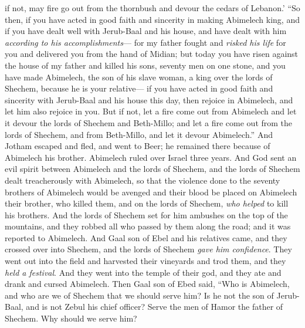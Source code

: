 \begin{biblechapter}
if not, may fire go out from the thornbush 
and devour the cedars of Lebanon.’
\verse “So then, if you have acted in good faith and sincerity in making Abimelech king, and if you have dealt well with Jerub-Baal and his house, and have dealt with him \textit{according to his accomplishments}—
\verse for my father fought and \textit{risked his life} for you and delivered you from the hand of Midian;
\verse but today you have risen against the house of my father and killed his sons, seventy men on one stone, and you have made Abimelech, the son of his slave woman, a king over the lords of Shechem, because he is your relative—
\verse if you have acted in good faith and sincerity with Jerub-Baal and his house this day, then rejoice in Abimelech, and let him also rejoice in you.
\verse But if not, let a fire come out from Abimelech and let it devour the lords of Shechem and Beth-Millo; and let a fire come out from the lords of Shechem, and from Beth-Millo, and let it devour Abimelech.”
\verse And Jotham escaped and fled, and went to Beer; he remained there because of Abimelech his brother.
 Abimelech ruled over Israel three years.
\verse And God sent an evil spirit between Abimelech and the lords of Shechem, and the lords of Shechem dealt treacherously with Abimelech,
\verse so that the violence done to the seventy brothers of Abimelech would be avenged and their blood be placed on Abimelech their brother, who killed them, and on the lords of Shechem, \textit{who helped} to kill his brothers.
\verse And the lords of Shechem set for him ambushes on the top of the mountains, and they robbed all who passed by them along the road; and it was reported to Abimelech.
\verse And Gaal son of Ebel and his relatives came, and they crossed over into Shechem, and the lords of Shechem \textit{gave him confidence}.
\verse They went out into the field and harvested their vineyards and trod them, and they \textit{held a festival}. And they went into the temple of their god, and they ate and drank and cursed Abimelech.
\verse Then Gaal son of Ebed said, “Who is Abimelech, and who are we of Shechem that we should serve him? Is he not the son of Jerub-Baal, and is not Zebul his chief officer? Serve the men of Hamor the father of Shechem. Why should we serve him?

\end{biblechapter}
